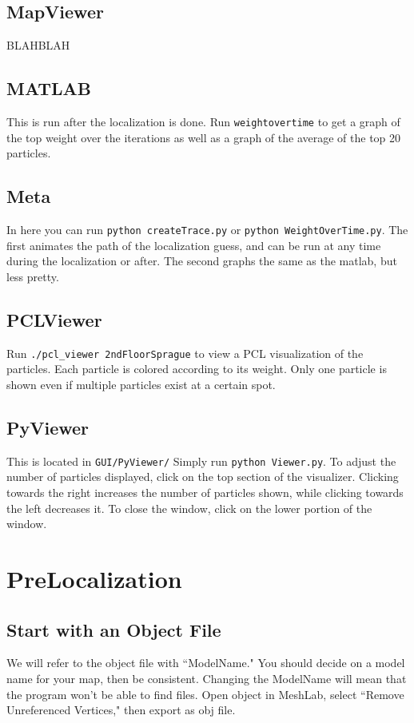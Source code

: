 \documentclass[11pt]{article}
\begin{document}
\subsection{MapViewer}
BLAHBLAH
\subsection{MATLAB}
This is run after the localization is done. Run \verb.weightovertime. to get a graph of the top weight over the iterations as well as a graph of the average of the top 20 particles.
\subsection{Meta}
In here you can run \verb`python createTrace.py` or \verb`python WeightOverTime.py`. The first animates the path of the localization guess, and can be run at any time during the localization or after. The second graphs the same as the matlab, but less pretty.
\subsection{PCLViewer}
Run \verb`./pcl_viewer 2ndFloorSprague` to view a PCL visualization of the particles. Each particle is colored according to its weight. Only one particle is shown even if multiple particles exist at a certain spot.
\subsection{PyViewer}
This is located in \verb.GUI/PyViewer/. Simply run \verb`python Viewer.py`. To adjust the number of particles displayed, click on the top section of the visualizer. Clicking towards the right increases the number of particles shown, while clicking towards the left decreases it. To close the window, click on the lower portion of the window.

\section{PreLocalization}
\subsection{Start with an Object File}
We will refer to the object file with ``ModelName." You should decide on a model name for your map, then be consistent. Changing the ModelName will mean that the program won't be able to find files. Open object in MeshLab, select ``Remove Unreferenced Vertices," then export as obj file.
\end{document}

